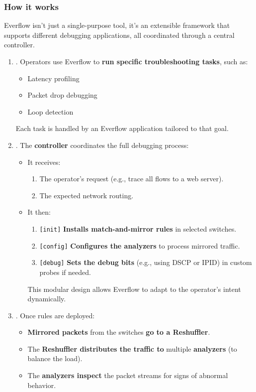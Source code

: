 \subsubsection{How it works}

Everflow isn't just a single-purpose tool, it's an extensible framework that supports different debugging applications, all coordinated through a central controller.
\begin{enumerate}
    \item {}. Operators use Everflow to \textbf{run specific troubleshooting tasks}, such as:
    \begin{itemize}
        \item Latency profiling
        \item Packet drop debugging
        \item Loop detection
    \end{itemize}
    Each task is handled by an Everflow application tailored to that goal.

    \item {}. The \textbf{controller} coordinates the full debugging process:
    \begin{itemize}
        \item It receives:
        \begin{enumerate}
            \item The operator's request (e.g., trace all flows to a web server).
            \item The expected network routing.
        \end{enumerate}

        \item It then:
        \begin{enumerate}
            \item \texttt{[init]} \textbf{Installs match-and-mirror rules} in selected switches.
            \item \texttt{[config]} \textbf{Configures the analyzers} to process mirrored traffic.
            \item \texttt{[debug]} \textbf{Sets the debug bits} (e.g., using DSCP or IPID) in custom probes if needed.
        \end{enumerate}
        This modular design allows Everflow to adapt to the operator's intent dynamically.
    \end{itemize}


    \item {}. Once rules are deployed:
    \begin{itemize}
        \item \textbf{Mirrored packets} from the switches \textbf{go to a Reshuffler}.
        \item The \textbf{Reshuffler distributes the traffic to} multiple \textbf{analyzers} (to balance the load).
        \item The \textbf{analyzers inspect} the packet streams for signs of abnormal behavior.
    \end{itemize}



\end{enumerate}
